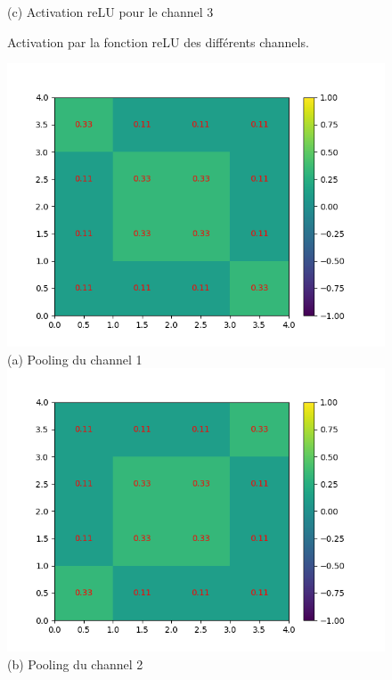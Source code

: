 \begin{figure}[h]
        \center 
        (c) Activation reLU pour le channel 3
    \endminipage
    \caption{Activation par la fonction reLU des différents channels.}
\end{figure}

\newpage

\begin{figure}[h]
        \includegraphics[width=\textwidth]{img/cnn_exemple/square/stride_1_max.png}
        \center 
        (a) Pooling du channel 1
    \endminipage\hfill
        \includegraphics[width=\textwidth]{img/cnn_exemple/square/stride_2_max.png}
        \center 
        (b) Pooling du channel 2
    \endminipage\hfill

\end{figure}
